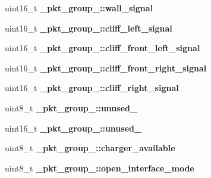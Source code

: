 \begin{DoxyCompactItemize}
\item 
\hypertarget{group__roomba-lib_ga7e7ae0e808a27271e60aa913b8d46c15}{}uint16\+\_\+t {\bfseries \+\_\+pkt\+\_\+group\+\_\+::wall\+\_\+signal}\label{group__roomba-lib_ga7e7ae0e808a27271e60aa913b8d46c15}

\item 
\hypertarget{group__roomba-lib_gab8e0719ade6458cda3c0f144d7e334b8}{}uint16\+\_\+t {\bfseries \+\_\+pkt\+\_\+group\+\_\+::cliff\+\_\+left\+\_\+signal}\label{group__roomba-lib_gab8e0719ade6458cda3c0f144d7e334b8}

\item 
\hypertarget{group__roomba-lib_gab3a0e2316ff2ff7306a9076ded5be399}{}uint16\+\_\+t {\bfseries \+\_\+pkt\+\_\+group\+\_\+::cliff\+\_\+front\+\_\+left\+\_\+signal}\label{group__roomba-lib_gab3a0e2316ff2ff7306a9076ded5be399}

\item 
\hypertarget{group__roomba-lib_gaf58dd5881c6c009bbea9aad4d65c2a58}{}uint16\+\_\+t {\bfseries \+\_\+pkt\+\_\+group\+\_\+::cliff\+\_\+front\+\_\+right\+\_\+signal}\label{group__roomba-lib_gaf58dd5881c6c009bbea9aad4d65c2a58}

\item 
\hypertarget{group__roomba-lib_ga45e63a9640cc3a2f227deb2b82b3c359}{}uint16\+\_\+t {\bfseries \+\_\+pkt\+\_\+group\+\_\+::cliff\+\_\+right\+\_\+signal}\label{group__roomba-lib_ga45e63a9640cc3a2f227deb2b82b3c359}

\item 
\hypertarget{group__roomba-lib_ga15cb0411237250d70c86d248930813c2}{}uint8\+\_\+t {\bfseries \+\_\+pkt\+\_\+group\+\_\+::unused\+\_}\label{group__roomba-lib_ga15cb0411237250d70c86d248930813c2}

\item 
\hypertarget{group__roomba-lib_ga84c17686e2a8930c3d0126626bcfc8f4}{}uint16\+\_\+t {\bfseries \+\_\+pkt\+\_\+group\+\_\+::unused\+\_}\label{group__roomba-lib_ga84c17686e2a8930c3d0126626bcfc8f4}

\item 
\hypertarget{group__roomba-lib_gac61e0fb99269a84221800b5b39a5c445}{}uint8\+\_\+t {\bfseries \+\_\+pkt\+\_\+group\+\_\+::charger\+\_\+available}\label{group__roomba-lib_gac61e0fb99269a84221800b5b39a5c445}

\item 
\hypertarget{group__roomba-lib_ga1f959128e277e39e02182cb39e5959a7}{}uint8\+\_\+t {\bfseries \+\_\+pkt\+\_\+group\+\_\+::open\+\_\+interface\+\_\+mode}\label{group__roomba-lib_ga1f959128e277e39e02182cb39e5959a7}


\end{DoxyCompactItemize}
